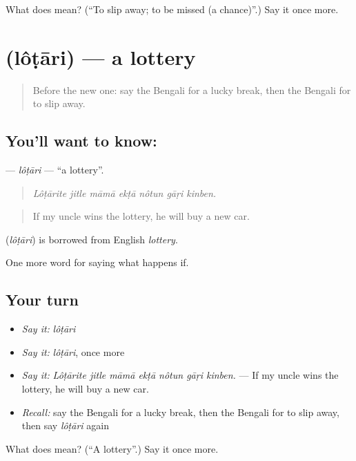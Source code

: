 \begin{tcolorbox}[breakable,colback=teal!4,colframe=teal!35!black,title={Before you move on}]
What does  mean? (\textquotedblleft{}To slip away; to be missed (a chance)\textquotedblright{}.) Say it once more.
\end{tcolorbox}
\section[\texorpdfstring{\bn{লটারি} (lôṭāri)}{লটারি (lôṭāri)}]{ (lôṭāri) — a lottery}

\label{lesson:BN-C533-lotari}



\begin{quote}
Before the new one: say the Bengali for a lucky break, then the Bengali for to slip away.
\end{quote}

\subsection*{You'll want to know: }
\textbf{} — \emph{lôṭāri} — \textquotedblleft{}a lottery\textquotedblright{}.

\begin{quote}
      
\end{quote}

\begin{quote}
\emph{Lôṭārite jitle māmā ekṭā nôtun gāṛi kinben.}
\end{quote}

\begin{quote}
If my uncle wins the lottery, he will buy a new car.
\end{quote}

\begin{cousinweb}
\textbf{} (\emph{lôṭāri}) is borrowed from English \emph{lottery}.
\end{cousinweb}

\begin{grammarlens}[title={What you've built}]
One more word for saying what happens if.
\end{grammarlens}

\subsection*{Your turn}
\begin{itemize}
\raggedright
  \item \emph{Say it:} \emph{lôṭāri}
  \item \emph{Say it:} \emph{lôṭāri}, once more
  \item \emph{Say it:} \emph{Lôṭārite jitle māmā ekṭā nôtun gāṛi kinben.} — If my uncle wins the lottery, he will buy a new car.
  \item \emph{Recall:} say the Bengali for a lucky break, then the Bengali for to slip away, then say \emph{lôṭāri} again
\end{itemize}

\begin{tcolorbox}[breakable,colback=teal!4,colframe=teal!35!black,title={Before you move on}]
What does  mean? (\textquotedblleft{}A lottery\textquotedblright{}.) Say it once more.
\end{tcolorbox}
